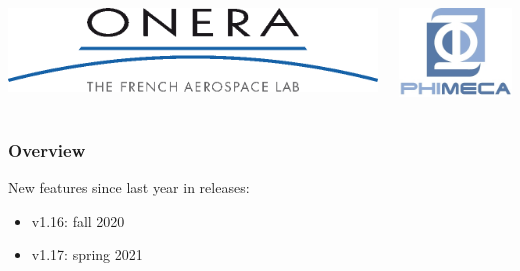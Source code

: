 \documentclass{beamer}
\begin{document}
\begin{frame}
\begin{columns}
  \begin{center}
\includegraphics[height=0.05\textheight]{figures/onera-logo.png}
\end{center}

  \begin{center}
\includegraphics[height=0.08\textheight]{figures/logo-phimeca.png}
\end{center}


  \end{columns}

  \end{frame}

\begin{frame}
\frametitle{Overview}

New features since last year in releases:

\begin{itemize}
\item v1.16: fall 2020
\item v1.17: spring 2021
\end{itemize}



\end{frame}
  
\end{document}

